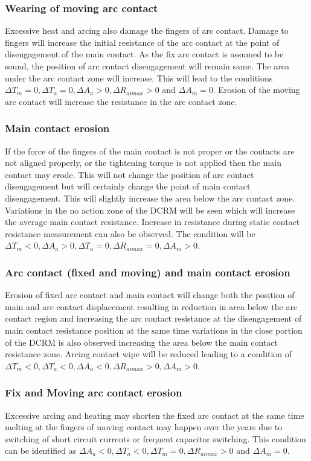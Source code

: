 \subsubsection*{Wearing of moving arc contact}
Excessive heat and arcing also damage the fingers of arc contact. Damage to fingers will increase the initial resistance of the arc contact at the point of disengagement of the main contact. As the fix arc contact is assumed to be sound, the position of arc contact disengagement will remain same. The area under the arc contact zone will increase. This will lead to the conditions $\Delta T_m = 0, \Delta T_a = 0, \Delta A_a > 0, \Delta R_{aimax} > 0$ and $\Delta A_m = 0$. Erosion of the moving arc contact will increase the resistance in the arc contact zone.

\subsubsection*{Main contact erosion}
If the force of the fingers of the main contact is not proper or the contacts are not aligned properly, or the tightening torque is not applied then the main contact may erode. This will not change the position of arc contact disengagement but will certainly change the point of main contact disengagement. This will slightly increase the area below the arc contact zone. Variations in the no action zone of the DCRM will be seen which will increase the average main contact resistance. Increase in resistance during static contact resistance measurement can also be observed. The condition will be $ \Delta T_m < 0, \Delta A_a > 0, \Delta T_a = 0, \Delta R_{aimax} = 0, \Delta A_m > 0$.

\subsubsection*{Arc contact (fixed and moving) and main contact erosion}
Erosion of fixed arc contact and main contact will change both the position of main and arc contact displacement resulting in reduction in area below the arc contact region and increasing the arc contact resistance at the disengagement of main contact resistance position at the same time variations in the close portion of the DCRM is also observed increasing the area below the main contact resistance zone. Arcing contact wipe will be reduced leading to a condition of $ \Delta T_m < 0, \Delta T_a < 0, \Delta A_a < 0, \Delta R_{aimax} > 0, \Delta A_m >0$.

\subsubsection*{Fix and Moving arc contact erosion}
Excessive arcing and heating may shorten the fixed arc contact at the same time melting at the fingers of moving contact may happen over the years due to switching of short circuit currents or frequent capacitor switching. This condition can be identified as $\Delta A_a < 0, \Delta T_a < 0, \Delta T_m = 0, \Delta R_{aimax} > 0$ and $ \Delta A_m = 0 $.

